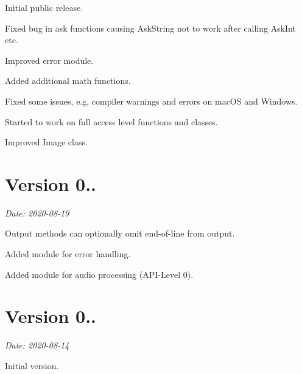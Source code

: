 \begin{DoxyItemize}
\item Initial public release.
\item Fixed bug in ask functions causing {\ttfamily Ask\+String} not to work after calling {\ttfamily Ask\+Int} etc.
\item Improved error module.
\item Added additional math functions.
\item Fixed some issues, e.\+g, compiler warnings and errors on mac\+OS and Windows.
\item Started to work on full access level functions and classes.
\item Improved Image class.
\end{DoxyItemize}

\section*{Version 0..}

{\itshape Date\+: 2020-\/08-\/19}


\begin{DoxyItemize}
\item Output methods can optionally omit end-\/of-\/line from output.
\item Added module for error handling.
\item Added module for audio processing (A\+P\+I-\/\+Level 0).
\end{DoxyItemize}

\section*{Version 0..}

{\itshape Date\+: 2020-\/08-\/14}


\begin{DoxyItemize}
\item Initial version. 
\end{DoxyItemize}